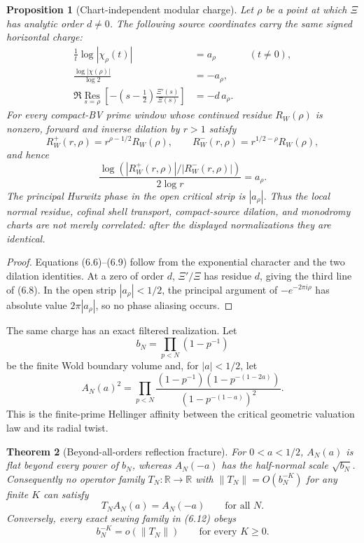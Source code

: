 \documentclass[11pt]{article}
\newtheorem{theorem}{Theorem}[section]
\newtheorem{proposition}[theorem]{Proposition}
\theoremstyle{definition}
\theoremstyle{remark}
\newcommand{\R}{\mathbb R}
\begin{document}
\begin{proposition}[Chart-independent modular charge]\label{prop:modular-charge}
Let $\rho$ be a point at which $\Xi$ has analytic order $d\ne0$.  The following source
coordinates carry the same signed horizontal charge:
\[
\begin{aligned}
 \frac1t\log|\chi_\rho(t)|&=a_\rho &&(t\ne0),\\
 \frac{\log|\chi(\rho)|}{\log2}&=-a_\rho,\\
 \Re\operatorname*{Res}_{s=\rho}
   \left[-(s-\tfrac12)\frac{\Xi'(s)}{\Xi(s)}\right]&=-d\,a_\rho.
\end{aligned}
\tag{6.8}
\]
For every compact-BV prime window whose continued residue $R_W(\rho)$ is nonzero, forward and
inverse dilation by $r>1$ satisfy
\[
 R_W^+(r,\rho)=r^{\rho-1/2}R_W(\rho),\qquad
 R_W^-(r,\rho)=r^{1/2-\rho}R_W(\rho),
\]
and hence
\[
 \frac{\log\!\left(|R_W^+(r,\rho)|/|R_W^-(r,\rho)|\right)}
      {2\log r}=a_\rho.
 \tag{6.9}
\]
The principal Hurwitz phase in the open critical strip is $|a_\rho|$.  Thus the local normal
residue, cofinal shell transport, compact-source dilation, and monodromy charts are not merely
correlated: after the displayed normalizations they are identical.
\end{proposition}

\begin{proof}
Equations (6.6)--(6.9) follow from the exponential character and the two dilation identities.
At a zero of order $d$, $\Xi'/\Xi$ has residue $d$, giving the third line of (6.8).
In the open strip $|a_\rho|<1/2$, the principal argument of
$-e^{-2\pi i\rho}$ has absolute value $2\pi|a_\rho|$, so no phase aliasing occurs.
\end{proof}

The same charge has an exact filtered realization.  Let
\[
 b_N=\prod_{p<N}(1-p^{-1})
\tag{6.10}
\]
be the finite Wold boundary volume and, for $|a|<1/2$, let
\[
 A_N(a)^2=
 \prod_{p<N}
 \frac{(1-p^{-1})(1-p^{-(1-2a)})}
      {(1-p^{-(1-a)})^2}.
\tag{6.11}
\]
This is the finite-prime Hellinger affinity between the critical geometric valuation law and its
radial twist.

\begin{theorem}[Beyond-all-orders reflection fracture]\label{thm:rees-fracture}
For $0<a<1/2$, $A_N(a)$ is flat beyond every power of $b_N$, whereas
$A_N(-a)$ has the half-normal scale $\sqrt{b_N}$.  Consequently no operator family
$T_N:\R\to\R$ with $\|T_N\|=O(b_N^{-K})$ for any finite $K$ can satisfy
\[
 T_N A_N(a)=A_N(-a)\qquad\text{for all }N.
\tag{6.12}
\]
Conversely, every exact sewing family in (6.12) obeys
\[
 b_N^{-K}=o(\|T_N\|)\qquad\text{for every }K\geq0.
\tag{6.13}
\]
\end{theorem}
\end{document}
